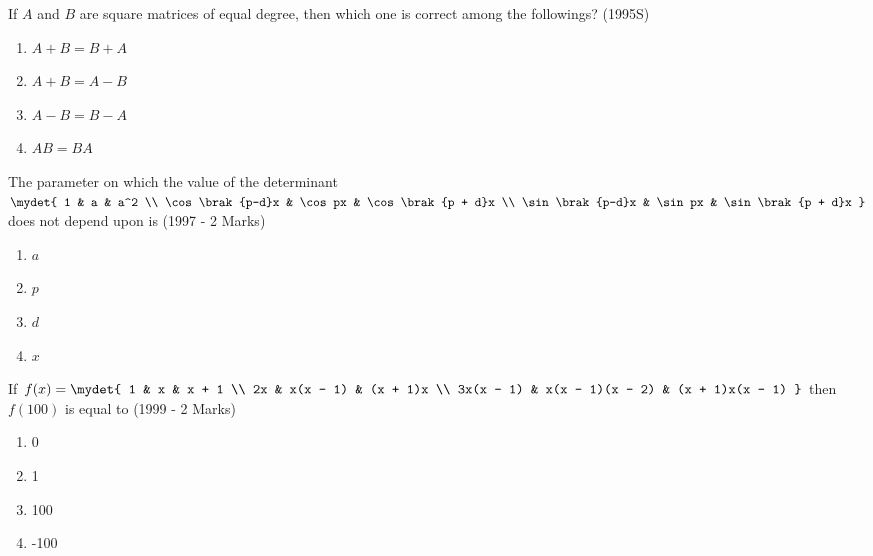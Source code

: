 	\item If $A$ and $B$ are square matrices of equal degree, then which
		one is correct among the followings?
		\hfill (1995S)

		\begin{multicols}{2}
			\begin{enumerate}
				\item $A + B = B + A$
				\item $A + B = A - B$
				\columnbreak
				\item $A - B = B - A$
				\item $AB = BA$
			\end{enumerate}
		\end{multicols}

	\item The parameter on which the value of the determinant $\mydet{
			1 & a & a^2 \\
			\cos\brak{p-d}x & \cos px & \cos\brak{p + d}x \\
			\sin\brak{p-d}x & \sin px & \sin\brak{p + d}x	
		}$ does not depend upon is
		\hfill (1997 - 2 Marks)

		\begin{multicols}{4}
			\begin{enumerate}
				\item $a$
				\item $p$
				\item $d$
				\item $x$
			\end{enumerate}
		\end{multicols}

	\item If $f(x) = \mydet{
			1 & x & x + 1 \\
			2x & x(x - 1) & (x + 1)x \\
			3x(x - 1) & x(x - 1)(x - 2) & (x + 1)x(x - 1)
		}$ then $f(100)$ is equal to
		\hfill (1999 - 2 Marks)

		\begin{multicols}{4}
			\begin{enumerate}
				\item 0
				\item 1
				\item 100
				\item -100
			\end{enumerate}
		\end{multicols}

